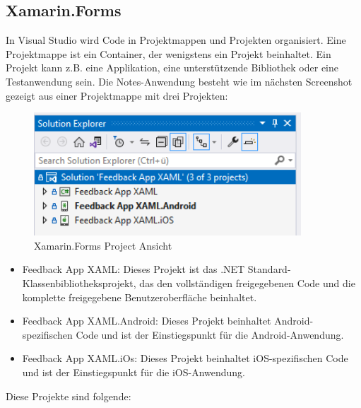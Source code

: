 \subsection{Xamarin.Forms}
In Visual Studio wird Code in Projektmappen und Projekten organisiert. Eine Projektmappe ist ein Container, der wenigstens ein Projekt beinhaltet. Ein Projekt kann z.B. eine Applikation, eine unterstützende Bibliothek oder eine Testanwendung sein. Die Notes-Anwendung besteht wie im nächsten Screenshot gezeigt aus einer Projektmappe mit drei Projekten:
\begin{figure}[h]
    \begin{center}\includegraphics[width=10cm]{pics/Xamarin2.png}
    \caption[Xamarin.Forms Project Ansicht]{Xamarin.Forms Project Ansicht}
    \end{center}
\end{figure}
\begin{itemize}
        \item Feedback App XAML: Dieses Projekt ist das .NET Standard-Klassenbibliotheksprojekt, das den vollständigen freigegebenen Code und die komplette freigegebene Benutzeroberfläche beinhaltet.
        \item Feedback App XAML.Android: Dieses Projekt beinhaltet Android-spezifischen Code und ist der Einstiegspunkt für die Android-Anwendung.
        \item Feedback App XAML.iOs: Dieses Projekt beinhaltet iOS-spezifischen Code und ist der Einstiegspunkt für die iOS-Anwendung.
\end{itemize}
\newpage
Diese Projekte sind folgende:
